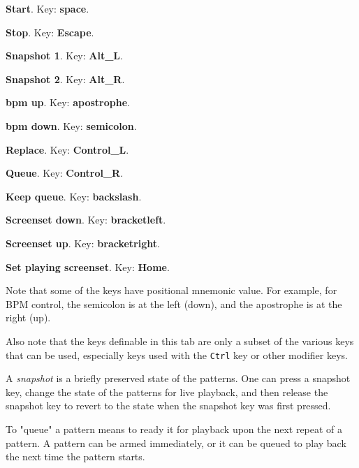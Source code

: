    \begin{enumber}
      \item \textbf{Start}.
         Key:  \textbf{space}.
      \item \textbf{Stop}.
         Key:  \textbf{Escape}.
      \item \textbf{Snapshot 1}.
         Key:  \textbf{Alt\_L}.
      \item \textbf{Snapshot 2}.
         Key:  \textbf{Alt\_R}.
      \item \textbf{bpm up}.
         Key:  \textbf{apostrophe}.
      \item \textbf{bpm down}.
         Key:  \textbf{semicolon}.
      \item \textbf{Replace}.
         Key:  \textbf{Control\_L}.
      \item \textbf{Queue}.
         Key:  \textbf{Control\_R}.
      \item \textbf{Keep queue}.
         Key:  \textbf{backslash}.
      \item \textbf{Screenset down}.
         Key: \index{keys![} \textbf{bracketleft}.
      \item \textbf{Screenset up}.
         Key: \index{keys!]} \textbf{bracketright}.
      \item \textbf{Set playing screenset}.
         Key:  \textbf{Home}.
   \end{enumber}

   Note that some of the keys have positional mnemonic value.  For example,
   for BPM control, the semicolon is at the left (down), and the apostrophe
   is at the right (up).

   Also note that the keys definable in this tab are only a subset of the
   various keys that can be used, especially keys used with the
   \texttt{Ctrl} key or other modifier keys.

   A \textsl{snapshot} is a briefly preserved state of the patterns.
   One can press a snapshot key, change the state of the patterns for live
   playback, and then release the snapshot key to revert to the state when
   the snapshot key was first pressed.

   To "queue" a pattern means to ready it for playback upon the next repeat
   of a pattern.  A pattern can be armed immediately, or it can be queued to
   play back the next time the pattern starts.

